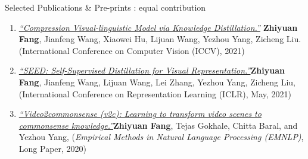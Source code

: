 \documentclass{resume} %
\begin{document}
\begin{rSection}{Selected Publications \& Pre-prints} 
{\small *: equal contribution} 
\begin{enumerate}
    
        
    \item\href{https://arxiv.org/abs/2104.02096}{\textit{``Compression Visual-linguistic Model via Knowledge Distillation.''}}{ \textbf{Zhiyuan Fang}, Jianfeng Wang, Xiaowei Hu, Lijuan Wang, Yezhou Yang, Zicheng Liu. (International Conference on Computer Vision (ICCV), 2021) }
    
    
        
    
    \item \href{https://arxiv.org/abs/2101.04731}{\textit{``SEED: Self-Supervised Distillation for Visual Representation.''}}{\textbf{{Zhiyuan Fang}}, Jianfeng Wang, Lijuan Wang, Lei Zhang, Yezhou Yang, Zicheng Liu,(International Conference on Representation Learning (ICLR), May, 2021)}
    
    
    \item \href{https://arxiv.org/pdf/2003.05162.pdf}{\textit{``Video2commonsense (v2c): Learning to transform video scenes to commonsense knowledge.''}}{\textbf{{Zhiyuan Fang}}, {Tejas Gokhale}, Chitta Baral, and Yezhou Yang, ({\textit{Empirical Methods in Natural Language Processing (EMNLP)}}, Long Paper, 2020)}
    

\end{enumerate}
\end{rSection}
\end{document}
